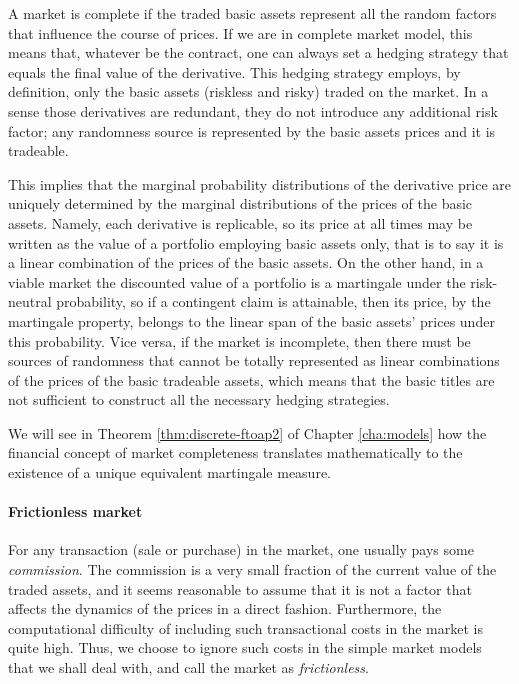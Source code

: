 A market is complete if the traded basic assets represent all the random factors that influence the course of prices. If we are in complete market model, this means that, whatever be the contract, one can always set a hedging strategy that equals the final value of the derivative. This hedging strategy employs, by definition, only the basic assets (riskless and risky) traded on the market. In a sense those derivatives are redundant, they do not introduce any additional risk factor; any randomness source is represented by the basic assets prices and it is tradeable.

This implies that the marginal probability distributions of the derivative price are uniquely determined by the marginal distributions of the prices of the basic assets. Namely, each derivative is replicable, so its price at all times may be written as the value of a portfolio employing basic assets only, that is to say it is a linear combination of the prices of the basic assets. On the other hand, in a viable market the discounted value of a portfolio is a martingale under the risk-neutral probability, so if a contingent claim is attainable, then its price, by the martingale property, belongs to the linear span of the basic assets' prices under this probability. Vice versa, if the market is incomplete, then there must be sources of randomness that cannot be totally represented as linear combinations of the prices of the basic tradeable assets, which means that the basic titles are not sufficient to construct all the necessary hedging strategies.

We will see in Theorem \ref{thm:discrete-ftoap2} of Chapter \ref{cha:models} how the financial concept of market completeness translates mathematically to the existence of a unique equivalent martingale measure.


\paragraph{Frictionless market}
For any transaction (sale or purchase) in the market, one usually pays some \emph{commission}. The commission is a very small fraction of the current value of the traded assets, and it seems reasonable to assume that it is not a factor that affects the dynamics of the prices in a direct fashion. Furthermore, the computational difficulty of including such transactional costs in the market is quite high. Thus, we choose to ignore such costs in the simple market models that we shall deal with, and call the market as \emph{frictionless}.

